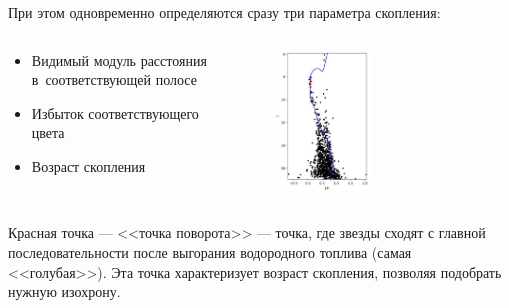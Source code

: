 \documentclass{beamer}
\begin{document}
\begin{frame}
\begin{columns}
\begin{column}{0.5\textwidth}
\begin{figure}
                \end{figure}
            \end{column}
        \end{columns}
    \end{frame}
    \begin{frame}
        При этом одновременно определяются сразу три параметра скопления:
        \begin{columns}
            \begin{column}{0.5\textwidth}
                \begin{itemize}
                    \item Видимый модуль расстояния в~соответствующей полосе
                    \item Избыток соответствующего цвета
                    \item Возраст скопления
                \end{itemize}
            \end{column}
            \begin{column}{0.5\textwidth}
                \begin{figure}
                \centering
                    \includegraphics[width=0.5\textwidth]{pictures/Iso2.jpg}
                \end{figure}
            \end{column}
        \end{columns}
        Красная точка --- <<точка поворота>> ---  точка, где звезды сходят с главной последовательности после выгорания водородного топлива (самая <<голубая>>).
        Эта точка характеризует возраст скопления, позволяя подобрать нужную изохрону.
    \end{frame}
\end{document}
